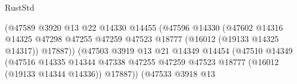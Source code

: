 \begin{lexlean}{RustStd}
\begin{coremodule}
                                                      (@47589
                                                        @3920
                                                        @13
                                                        @22
                                                        @14330
                                                        @14455
                                                        (@47596
                                                          @14330
                                                          (@47602
                                                            @14316
                                                            @14325
                                                            @47298
                                                            @47255
                                                            @47259
                                                            @47523
                                                            @18777
                                                            (@16012 (@19133 @14325 @14317))
                                                            @17887))
                                                        (@47503
                                                          @3919
                                                          @13
                                                          @21
                                                          @14349
                                                          @14454
                                                          (@47510
                                                            @14349
                                                            (@47516
                                                              @14335
                                                              @14344
                                                              @47338
                                                              @47255
                                                              @47259
                                                              @47523
                                                              @18777
                                                              (@16012 (@19133 @14344 @14336))
                                                              @17887))
                                                          (@47533
                                                            @3918
                                                            @13

\end{coremodule}
\end{lexlean}
